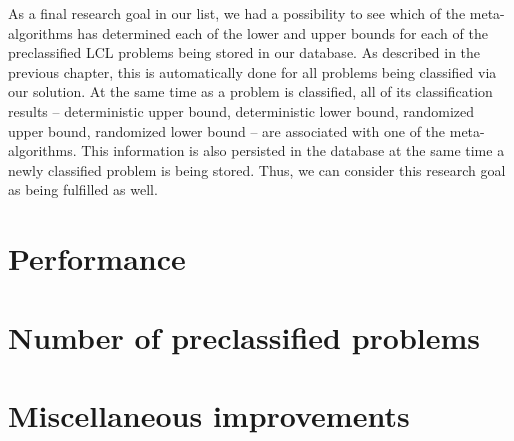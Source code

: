 As a final research goal in our list, we had a possibility
to see which of the meta-algorithms has determined each
of the lower and upper bounds for each of the preclassified
LCL problems being stored in our database. As described in the
previous chapter, this is automatically done for all problems being
classified via our solution. At the same time as a problem is classified,
all of its classification results -- deterministic upper bound,
deterministic lower bound, randomized upper bound, randomized lower bound --
are associated with one of the meta-algorithms. This information is also
persisted in the database at the same time a newly classified problem
is being stored. Thus, we can consider this research goal as being
fulfilled as well.

\section{Performance}




\section{Number of preclassified problems}



\section{Miscellaneous improvements}
